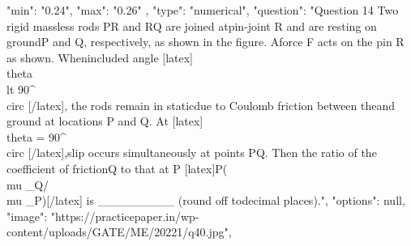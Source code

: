 {    "min": "0.24",
    "max": "0.26"
  },
  {
    "type": "numerical",
    "question": "Question 14 Two rigid massless rods PR and RQ are joined at\nfrictionless pin-joint R and are resting on ground\nat P and Q, respectively, as shown in the figure. A\nvertical force F acts on the pin R as shown. When\nthe included angle [latex]\\theta \\lt 90^{\\circ} [/latex], the rods remain in static\nequilibrium due to Coulomb friction between the\nrods and ground at locations P and Q. At [latex]\\theta = 90^{\\circ} [/latex],\nimpending slip occurs simultaneously at points P\nand Q. Then the ratio of the coefficient of friction\nat Q to that at P [latex]P(\\mu _Q/\\mu _P)[/latex] is _________ (round off to\ntwo decimal places).",
    "options": null,
    "image": "https://practicepaper.in/wp-content/uploads/GATE/ME/20221/q40.jpg",
}
